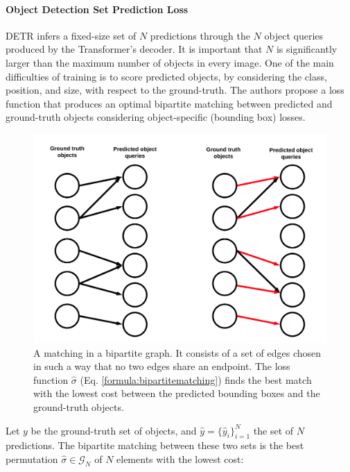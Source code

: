 \paragraph{Object Detection Set Prediction Loss} DETR \cite{detr} infers a fixed-size set of $N$ predictions through the $N$ object queries produced by the Transformer's decoder. It is important that $N$ is significantly larger than the maximum number of objects in every image. One of the main difficulties of training is to score predicted objects, by considering the class, position, and size, with respect to the ground-truth. The authors propose a loss function that produces
an optimal bipartite matching between predicted and ground-truth objects considering object-specific (bounding box) losses. 

\begin{figure}[h!]
	\centering
	\includegraphics[width=0.9\linewidth]{images/bipartitematching.png}
	\caption{A matching in a bipartite graph. It consists of a set of edges chosen in such a way that no two edges share an endpoint. The loss function $\hat \sigma$ (Eq. \ref{formula:bipartitematching}) finds the best match with the lowest cost between the predicted bounding boxes and the ground-truth objects.}
	\label{}
\end{figure}

Let $y$ be the ground-truth set of objects, and $\hat y = \{\hat y_i\}^{N}_{i = 1}$ the set of $N$ predictions. The bipartite matching between these two sets is the best permutation $\hat \sigma \in \mathcal{G}_N$ of $N$ elements with the lowest cost:

